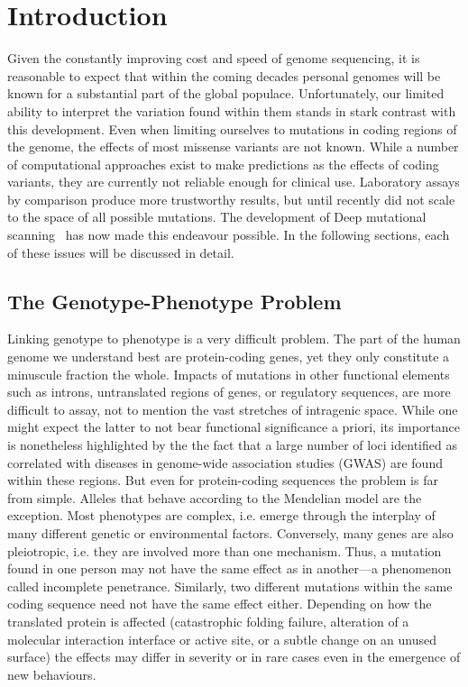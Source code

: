 
\chapter{Introduction}

Given the constantly improving cost and speed of genome sequencing, it is reasonable to expect that within the coming decades personal genomes will be known for a substantial part of the global populace. Unfortunately, our limited ability to interpret the variation found within them stands in stark contrast with this development. Even when limiting ourselves to mutations in coding regions of the genome, the effects of most missense variants are not known. While a number of computational approaches exist to make predictions as the effects of coding variants, they are currently not reliable enough for clinical use. Laboratory assays by comparison produce more trustworthy results, but until recently did not scale to the space of all possible mutations. The development of Deep mutational scanning~\cite{fowler_high-resolution_2010} has now made this endeavour possible. In the following sections, each of these issues will be discussed in detail.

\section{The Genotype-Phenotype Problem}

Linking genotype to phenotype is a very difficult problem. The part of the human genome we understand best are protein-coding genes, yet they only constitute a minuscule fraction the whole. Impacts of mutations in other functional elements such as introns, untranslated regions of genes, or regulatory sequences, are more difficult to assay, not to mention the vast stretches of intragenic space. While one might expect the latter to not bear functional significance a priori, its importance is nonetheless highlighted by the the fact that a large number of loci identified as correlated with diseases in genome-wide association studies (GWAS) are found within these regions.
But even for protein-coding sequences the problem is far from simple. Alleles that behave according to the Mendelian model are the exception. Most phenotypes are complex, i.e. emerge through the interplay of many different genetic or environmental factors. Conversely, many genes are also pleiotropic, i.e. they are involved more than one mechanism. Thus, a mutation found in one person may not have the same effect as in another---a phenomenon called incomplete penetrance. Similarly, two different mutations within the same coding sequence need not have the same effect either. Depending on how the translated protein is affected (catastrophic folding failure, alteration of a molecular interaction interface or active site, or a subtle change on an unused surface) the effects may differ in severity or in rare cases even in the emergence of new behaviours.

